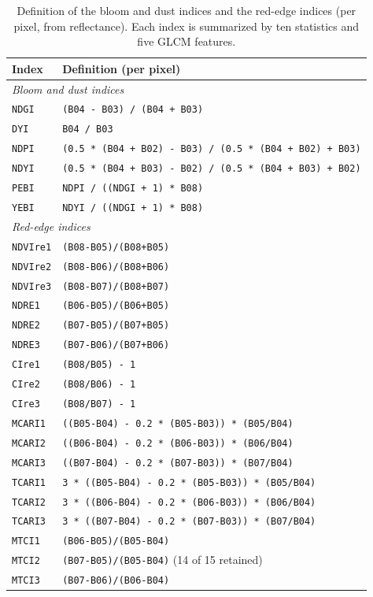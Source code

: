 \documentclass[draft,ea]{agutexSI2019}
\begin{document}
\begin{table}
\caption{Definition of the bloom and dust indices and the red-edge indices (per pixel, from reflectance). Each index is summarized by ten statistics and five GLCM features.}
\centering
\scriptsize\baselineskip=9pt\normalbaselineskip=9pt
\begin{tabular}{l p{}}
\hline
Index & Definition (per pixel) \\
\hline
\multicolumn{2}{l}{\textit{Bloom and dust indices}} \\
\texttt{NDGI} & \texttt{(B04 - B03) / (B04 + B03)} \\
\texttt{DYI} & \texttt{B04 / B03} \\
\texttt{NDPI} & \texttt{(0.5 * (B04 + B02) - B03) / (0.5 * (B04 + B02) + B03)} \\
\texttt{NDYI} & \texttt{(0.5 * (B04 + B03) - B02) / (0.5 * (B04 + B03) + B02)} \\
\texttt{PEBI} & \texttt{NDPI / ((NDGI + 1) * B08)} \\
\texttt{YEBI} & \texttt{NDYI / ((NDGI + 1) * B08)} \\
\multicolumn{2}{l}{\textit{Red-edge indices}} \\
\texttt{NDVIre1} & \texttt{(B08-B05)/(B08+B05)} \\
\texttt{NDVIre2} & \texttt{(B08-B06)/(B08+B06)} \\
\texttt{NDVIre3} & \texttt{(B08-B07)/(B08+B07)} \\
\texttt{NDRE1} & \texttt{(B06-B05)/(B06+B05)} \\
\texttt{NDRE2} & \texttt{(B07-B05)/(B07+B05)} \\
\texttt{NDRE3} & \texttt{(B07-B06)/(B07+B06)} \\
\texttt{CIre1} & \texttt{(B08/B05) - 1} \\
\texttt{CIre2} & \texttt{(B08/B06) - 1} \\
\texttt{CIre3} & \texttt{(B08/B07) - 1} \\
\texttt{MCARI1} & \texttt{((B05-B04) - 0.2 * (B05-B03)) * (B05/B04)} \\
\texttt{MCARI2} & \texttt{((B06-B04) - 0.2 * (B06-B03)) * (B06/B04)} \\
\texttt{MCARI3} & \texttt{((B07-B04) - 0.2 * (B07-B03)) * (B07/B04)} \\
\texttt{TCARI1} & \texttt{3 * ((B05-B04) - 0.2 * (B05-B03)) * (B05/B04)} \\
\texttt{TCARI2} & \texttt{3 * ((B06-B04) - 0.2 * (B06-B03)) * (B06/B04)} \\
\texttt{TCARI3} & \texttt{3 * ((B07-B04) - 0.2 * (B07-B03)) * (B07/B04)} \\
\texttt{MTCI1} & \texttt{(B06-B05)/(B05-B04)} \\
\texttt{MTCI2} & \texttt{(B07-B05)/(B05-B04)} (14 of 15 retained) \\
\texttt{MTCI3} & \texttt{(B07-B06)/(B06-B04)} \\
\hline
\end{tabular}
\end{table}
\end{document}

